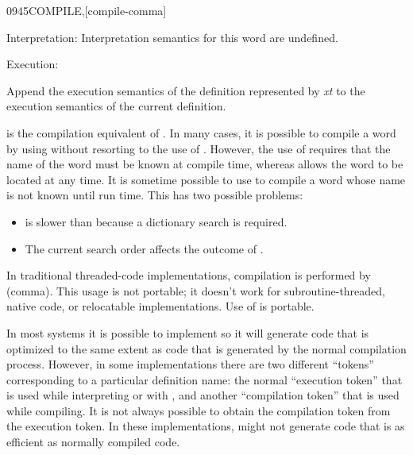\begin{newword*}{0945}{COMPILE,}[compile-comma]
\item[Interpretation:]
	Interpretation semantics for this word are undefined.

\item[Execution:]

	Append the execution semantics of the definition represented
	by \emph{xt} to the execution semantics of the current
	definition.

	\begin{rationale} %
		 is the compilation equivalent of
		. In many cases, it is possible to compile a
		word by using  without resorting to the use of
		. However, the use of  requires
		that the name of the word must be known at compile time,
		whereas  allows the word to be located at any
		time. It is sometime possible to use  to compile
		a word whose name is not known until run time. This has two
		possible problems:
		\begin{itemize}
		\item {} is slower than  because a
			dictionary search is required.
		\item The current search order affects the outcome of
			.
		\end{itemize}
		In traditional threaded-code implementations, compilation is
		performed by \word{,} (comma). This usage is not portable; it
		doesn't work for subroutine-threaded, native code, or
		relocatable implementations. Use of  is portable.

		In most systems it is possible to implement  so
		it will generate code that is optimized to the same extent as
		code that is generated by the normal compilation process.
		However, in some implementations there are two different
		``tokens'' corresponding to a particular definition name:
		the normal ``execution token'' that is used while interpreting
		or with , and another ``compilation token'' that
		is used while compiling. It is not always possible to obtain
		the compilation token from the execution token. In these
		implementations,  might not generate code that
		is as efficient as normally compiled code.
	\end{rationale}
\end{newword*}


